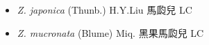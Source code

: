 \begin{itemize}
  \begin{itemize}
        \item[] \textit{Z. japonica} (Thunb.) H.Y.Liu  馬瓝兒   LC
        \item[] \textit{Z. mucronata} (Blume) Miq.  黑果馬瓝兒   LC
  \end{itemize}
  \end{itemize}
